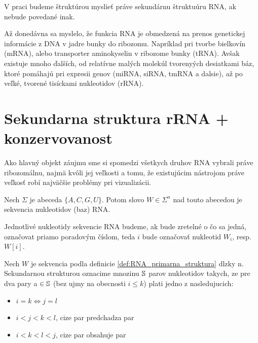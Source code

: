 V praci budeme štruktúrou myslieť práve sekundárnu štruktuúru RNA, ak nebude povedané inak.

Až donedávna sa myslelo, že funkcia RNA je obmedzená na prenos genetickej informácie z DNA
v jadre bunky do ribozomu. Napríklad pri tvorbe bielkovín (mRNA), alebo transporter aminokyselin
v ribozome bunky (tRNA).
Avšak existuje mnoho ďalších, od relatívne
malých molekúl tvorenyých desiatkami báz, ktoré pomáhajú pri expresii genov
(miRNA, siRNA, tmRNA a dalsie), až po veľké, tvorené tisíckami nukleotidov (rRNA).

\section{Sekundarna struktura rRNA + konzervovanost}

Ako hlavný objekt záujmu sme si spomedzi všetkych druhov RNA vybrali práve ribozomálnu,
najmä kvôli jej veľkosti a tomu, že existujúcim nástrojom práve veľkosť robí najväčšie problémy
pri vizualizácii.

\begin{definice}
  \label{def:RNA_primarna_struktura}
  Nech $\Sigma$ je abeceda $\{A, C, G, U\}$. Potom slovo $W \in \Sigma^n$ nad touto abecedou
  je sekvencia nukleotidov (baz) RNA.
\end{definice}

Jednotlivé nukleotidy sekvencie RNA budeme, ak bude zretelné o čo sa jedná, označovat priamo poradovým 
číslom, teda $i$ bude označovať nukleotid $W_{i}$, resp. $W[i]$.

\begin{definice}
  \label{def:RNA_sekundarna_struktura}
  Nech $W$ je sekvencia podla definicie \ref{def:RNA_primarna_struktura} dlzky n.
  Sekundarnou strukturou oznacime mnozinu $\mathbb{S}$ parov nukleotidov  takych, ze
  pre dva pary  a  $\in \mathbb{S}$ (bez ujmy na obecnosti $i \leq k$)
  plati jedno z nasledujucich:
  \begin{itemize}
    \item $i = k \iff j = l$
    \item $i < j < k < l$, cize par  predchadza par 
    \item $i < k < l < j$, cize par  obsahuje par 
  \end{itemize}
\end{definice}


